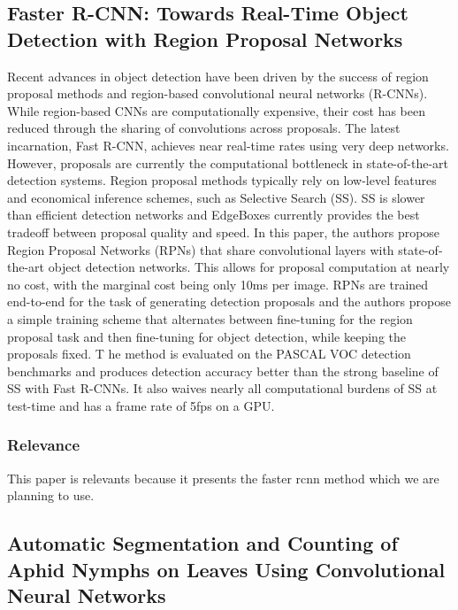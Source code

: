 \documentclass{article}
\begin{document}
\subsection*{Faster R-CNN: Towards Real-Time Object Detection with Region Proposal Networks \cite{FasterRCNN}}
Recent advances in object detection have been driven by the success of region proposal methods
and region-based convolutional neural networks (R-CNNs). While region-based CNNs are computationally expensive,
their cost has been reduced through the sharing of convolutions across proposals. The latest incarnation, Fast R-CNN,
achieves near real-time rates using very deep networks. However,
proposals are currently the computational bottleneck in state-of-the-art detection systems.
Region proposal methods typically rely on low-level features and economical inference schemes,
such as Selective Search (SS). SS is slower than efficient detection networks and EdgeBoxes currently
provides the best tradeoff between proposal quality and speed. In this paper,
the authors propose Region Proposal Networks (RPNs) that share convolutional layers with
state-of-the-art object detection networks. This allows for proposal computation at nearly no cost,
with the marginal cost being only 10ms per image. RPNs are trained end-to-end for the task of generating
detection proposals and the authors propose a simple training scheme that alternates between fine-tuning for
the region proposal task and then fine-tuning for object detection, while keeping the proposals fixed. T
he method is evaluated on the PASCAL VOC detection benchmarks and produces detection accuracy better
than the strong baseline of SS with Fast R-CNNs. It also waives nearly all
computational burdens of SS at test-time and has a frame rate of 5fps on a GPU.

\subsubsection*{Relevance}
This paper is relevants because it presents the faster rcnn method which we are planning to use.


\subsection*{Automatic Segmentation and Counting of Aphid Nymphs on Leaves Using Convolutional Neural Networks \cite{AutoSegmentation}}
\end{document}
